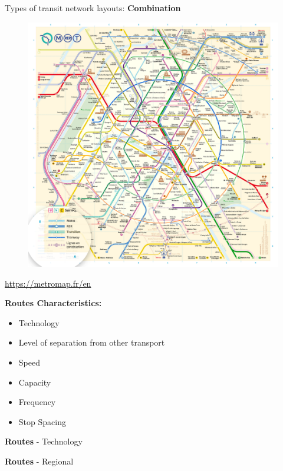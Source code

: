 \documentclass[aspectratio=169]{beamer}
\begin{document}
\begin{frame}
	
	Types of transit network layouts: \textbf{Combination}
	
	\begin{figure}
		\centering
		\includegraphics[width=0.6\linewidth]{images/paris_metro.png}
	\end{figure}
	
	
	\tiny \url{https://metromap.fr/en}
\end{frame}



\begin{frame}
	
	\textbf{Routes Characteristics:
	}
	
	\vspace{2mm}
	\begin{itemize}
		\item Technology
		\item Level of separation from other transport
		\item Speed
		\item Capacity
		\item Frequency
		\item Stop Spacing
	\end{itemize}
	
\end{frame}


\begin{frame}
	
	\textbf{Routes} - Technology 
	
\end{frame}


\begin{frame}
	
	\textbf{Routes} - Regional 
	
\end{frame}
\end{document}
